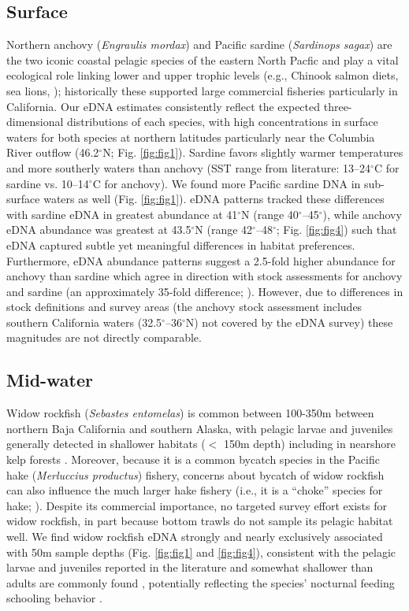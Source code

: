 \documentclass{article}
\begin{document}
\subsection*{Surface}
Northern anchovy (\textit{Engraulis mordax}) and Pacific sardine (\textit{Sardinops sagax}) are the two iconic coastal pelagic species of the eastern North Pacfic \cite{steinbeck1945} and play a vital ecological role linking lower and upper trophic levels (e.g., Chinook salmon diets, sea lions, \cite{kaplan2019}); historically these supported large commercial fisheries particularly in California. Our eDNA estimates consistently reflect the expected three-dimensional distributions of each species, with high concentrations in surface waters for both species at northern latitudes \cite{litz2008,parnel2008} particularly near the Columbia River outflow (46.2$^\circ$N; Fig. \ref{fig:fig1}). Sardine favors slightly warmer temperatures and more southerly waters than anchovy (SST range from literature: 13–24$^\circ$C for sardine vs. 10–14$^\circ$C for anchovy).  We found more Pacific sardine DNA in sub-surface waters as well (Fig. \ref{fig:fig1}). eDNA patterns tracked these differences with sardine eDNA in greatest abundance at 41$^\circ$N (range 40$^\circ$–45$^\circ$), while anchovy eDNA abundance was greatest at 43.5$^\circ$N (range 42$^\circ$–48$^\circ$; Fig. \ref{fig:fig4}) such that eDNA captured subtle yet meaningful differences in habitat preferences. Furthermore, eDNA abundance patterns suggest a 2.5-fold higher abundance for anchovy than sardine which agree in direction with stock assessments for anchovy and sardine (an approximately 35-fold difference; \cite{kuriyama2022, kuriyama2022b}). However, due to differences in stock definitions and survey areas (the anchovy stock assessment includes southern California waters (32.5$^\circ$–36$^\circ$N) not covered by the eDNA survey) these magnitudes are not directly comparable.

\subsection*{Mid-water}
Widow rockfish (\textit{Sebastes entomelas}) is common between 100-350m between northern Baja California and southern Alaska, with pelagic larvae and juveniles generally detected in shallower habitats ($<$ 150m depth) \cite{reynolds2001,bosley2014} including in nearshore kelp forests \cite{quigley2024, laidig2007} . Moreover, because it is a common bycatch species in the Pacific hake (\textit{Merluccius productus}) fishery, concerns about bycatch of widow rockfish can also influence the much larger hake fishery (i.e., it is a “choke” species for hake; \cite{somers2018}). Despite its commercial importance, no targeted survey effort exists for widow rockfish, in part because bottom trawls do not sample its pelagic habitat well. We find widow rockfish eDNA strongly and nearly exclusively associated with 50m sample depths (Fig. \ref{fig:fig1} and \ref{fig:fig4}), consistent with the pelagic larvae and juveniles reported in the literature and somewhat shallower than adults are commonly found \cite{reynolds2001,bosley2014,quigley2024}, potentially reflecting the species’ nocturnal feeding schooling behavior \cite{reynolds2001,bosley2014}.
\end{document}
